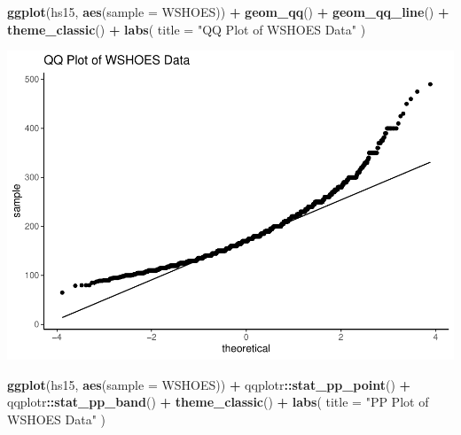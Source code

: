 \documentclass[]{article}
\newenvironment{Shaded}{\begin{snugshade}}{\end{snugshade}}
\newcommand{\DataTypeTok}[1]{\textcolor[rgb]{0.13,0.29,0.53}{#1}}
\newcommand{\KeywordTok}[1]{\textcolor[rgb]{0.13,0.29,0.53}{\textbf{#1}}}
\newcommand{\NormalTok}[1]{#1}
\newcommand{\OperatorTok}[1]{\textcolor[rgb]{0.81,0.36,0.00}{\textbf{#1}}}
\newcommand{\StringTok}[1]{\textcolor[rgb]{0.31,0.60,0.02}{#1}}
\begin{document}
\begin{Shaded}
\begin{Highlighting}[]
\KeywordTok{ggplot}\NormalTok{(hs15, }\KeywordTok{aes}\NormalTok{(}\DataTypeTok{sample =}\NormalTok{ WSHOES)) }\OperatorTok{+}
\StringTok{  }\KeywordTok{geom_qq}\NormalTok{() }\OperatorTok{+}
\StringTok{  }\KeywordTok{geom_qq_line}\NormalTok{() }\OperatorTok{+}
\StringTok{  }\KeywordTok{theme_classic}\NormalTok{() }\OperatorTok{+}
\StringTok{  }\KeywordTok{labs}\NormalTok{(}
    \DataTypeTok{title =} \StringTok{"QQ Plot of WSHOES Data"}
\NormalTok{  )}
\end{Highlighting}
\end{Shaded}

\includegraphics{assignment2_files/figure-latex/q7-2.pdf}

\begin{Shaded}
\begin{Highlighting}[]
\KeywordTok{ggplot}\NormalTok{(hs15, }\KeywordTok{aes}\NormalTok{(}\DataTypeTok{sample =}\NormalTok{ WSHOES)) }\OperatorTok{+}
\StringTok{  }\NormalTok{qqplotr}\OperatorTok{::}\KeywordTok{stat_pp_point}\NormalTok{() }\OperatorTok{+}
\StringTok{  }\NormalTok{qqplotr}\OperatorTok{::}\KeywordTok{stat_pp_band}\NormalTok{() }\OperatorTok{+}
\StringTok{  }\KeywordTok{theme_classic}\NormalTok{() }\OperatorTok{+}
\StringTok{  }\KeywordTok{labs}\NormalTok{(}
    \DataTypeTok{title =} \StringTok{"PP Plot of WSHOES Data"}
\NormalTok{  )}
\end{Highlighting}
\end{Shaded}
\end{document}
